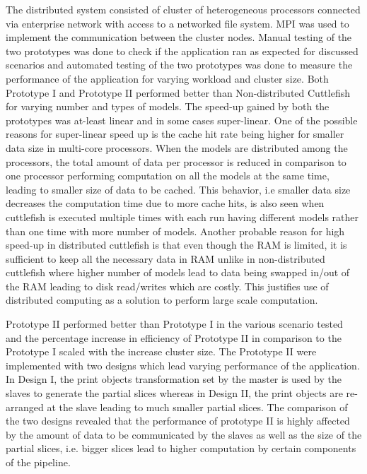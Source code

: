 The distributed system consisted of cluster of heterogeneous processors connected via enterprise network with access to a networked file system. MPI was used to implement the communication between the cluster nodes. Manual testing of the two prototypes was done to check if the application ran as expected for discussed scenarios and automated testing of the two prototypes was done to measure the performance of the application for varying workload and cluster size. Both Prototype I and Prototype II performed better than Non-distributed Cuttlefish for varying number and types of models. The speed-up gained by both the prototypes was at-least linear and in some cases super-linear. One of the possible reasons for super-linear speed up is the cache hit rate being higher for smaller data size in multi-core processors. When the models are distributed among the processors, the total amount of data per processor is reduced in comparison to one processor performing computation on all the models at the same time, leading to smaller size of data to be cached. This behavior, i.e smaller data size decreases the computation time due to more cache hits, is also seen when cuttlefish is executed multiple times with each run having different models rather than one time with more number of models. Another probable reason for high speed-up in distributed cuttlefish is that even though the RAM is limited, it is sufficient to keep all the necessary data in RAM unlike in non-distributed cuttlefish where higher number of models lead to data being swapped in/out of the RAM leading to disk read/writes which are costly. This justifies use of distributed computing as a solution to perform large scale computation. \newline

Prototype II performed better than Prototype I in the various scenario tested and the percentage increase in efficiency of Prototype II in comparison to the Prototype I scaled with the increase cluster size. The Prototype II were implemented with two designs which lead varying performance of the application. In Design I, the print objects transformation set by the master is used by the slaves to generate the partial slices whereas in Design II, the print objects are re-arranged at the slave leading to much smaller partial slices. The comparison of the two designs revealed that the performance of prototype II is highly affected by the amount of data to be communicated by the slaves as well as the size of the partial slices, i.e. bigger slices lead to higher computation by certain components of the pipeline. \newline


